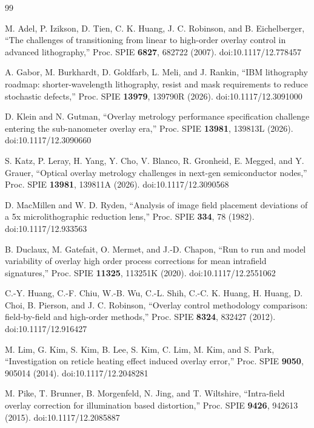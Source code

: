 \documentclass[11pt,a4paper]{ltjsarticle}
\begin{document}
\begin{thebibliography}{99}

M. Adel, P. Izikson, D. Tien, C. K. Huang, J. C. Robinson, and B. Eichelberger,
``The challenges of transitioning from linear to high-order overlay control in advanced lithography,''
Proc. SPIE \textbf{6827}, 682722 (2007). doi:10.1117/12.778457

A. Gabor, M. Burkhardt, D. Goldfarb, L. Meli, and J. Rankin,
``IBM lithography roadmap: shorter-wavelength lithography, resist and mask requirements to reduce stochastic defects,''
Proc. SPIE \textbf{13979}, 139790R (2026). doi:10.1117/12.3091000

D. Klein and N. Gutman,
``Overlay metrology performance specification challenge entering the sub-nanometer overlay era,''
Proc. SPIE \textbf{13981}, 139813L (2026). doi:10.1117/12.3090660

S. Katz, P. Leray, H. Yang, Y. Cho, V. Blanco, R. Gronheid, E. Megged, and Y. Grauer,
``Optical overlay metrology challenges in next-gen semiconductor nodes,''
Proc. SPIE \textbf{13981}, 139811A (2026). doi:10.1117/12.3090568

D. MacMillen and W. D. Ryden,
``Analysis of image field placement deviations of a 5x microlithographic reduction lens,''
Proc. SPIE \textbf{334}, 78 (1982). doi:10.1117/12.933563

B. Duclaux, M. Gatefait, O. Mermet, and J.-D. Chapon,
``Run to run and model variability of overlay high order process corrections for mean intrafield signatures,''
Proc. SPIE \textbf{11325}, 113251K (2020). doi:10.1117/12.2551062

C.-Y. Huang, C.-F. Chiu, W.-B. Wu, C.-L. Shih, C.-C. K. Huang, H. Huang, D. Choi, B. Pierson, and J. C. Robinson,
``Overlay control methodology comparison: field-by-field and high-order methods,''
Proc. SPIE \textbf{8324}, 832427 (2012). doi:10.1117/12.916427

M. Lim, G. Kim, S. Kim, B. Lee, S. Kim, C. Lim, M. Kim, and S. Park,
``Investigation on reticle heating effect induced overlay error,''
Proc. SPIE \textbf{9050}, 905014 (2014). doi:10.1117/12.2048281

M. Pike, T. Brunner, B. Morgenfeld, N. Jing, and T. Wiltshire,
``Intra-field overlay correction for illumination based distortion,''
Proc. SPIE \textbf{9426}, 942613 (2015). doi:10.1117/12.2085887


\end{thebibliography}
\end{document}
